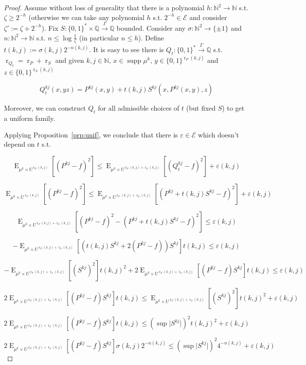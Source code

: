 \documentclass{article}
\numberwithin{equation}{section}
\theoremstyle{definition}
\theoremstyle{plain}
\newcommand{\Words}{{\{ 0, 1 \}^*}}
\newcommand{\WordsLen}[1]{{\{ 0, 1 \}^{#1}}}
\DeclareMathOperator{\Supp}{supp}
\DeclareMathOperator{\E}{E}
\DeclareMathOperator{\R}{r}
\newcommand{\Nats}{\mathbb{N}}
\newcommand{\Rats}{\mathbb{Q}}
\newcommand{\Abs}[1]{\lvert #1 \rvert}
\newcommand{\Fall}{\mathcal{E}}
\newcommand{\Scheme}{\xrightarrow{\Gamma}}
\begin{document}
\begin{proof}

Assume without loss of generality that there is a polynomial ${h: \Nats^2 \rightarrow \Nats}$ s.t. $\zeta \geq 2^{-h}$ (otherwise we can take any polynomial $h$ s.t. $2^{-h} \in \Fall$ and consider $\zeta':=\zeta+2^{-h}$). Fix $S: \Words \times \Rats \Scheme \Rats$ bounded. Consider any ${\sigma: \Nats^2 \rightarrow \{ \pm 1 \}}$ and $n: \Nats^2 \rightarrow \Nats$ s.t. $n \leq \log \frac{1}{\zeta}$ (in particular $n \leq h$). Define ${t(k,j) := \sigma(k,j) 2^{-n(k,j)}}$. It is easy to see there is ${Q_t: \Words \Scheme \Rats}$ s.t. ${\R_{Q_t}=\R_P+\R_S}$ and given $k,j \in \Nats$, $x \in \Supp \mu^k$, ${y \in \WordsLen{\R_P(k,j)}}$ and ${z \in \WordsLen{ \R_S(k,j)}}$

$$Q_t^{kj}(x,yz) = P^{kj}(x,y) + t(k,j) S^{kj}(x,P^{kj}(x,y),z)$$

Moreover, we can construct $Q_t$ for all admissible choices of $t$ (but fixed $S$) to get a uniform family.

Applying Proposition~\ref{prp:unif}, we conclude that there is $\varepsilon \in \Fall$ which doesn't depend on $t$ s.t.

$$\E_{\mu^k \times U^{\R_P(k,j)}}[(P^{kj} - f)^2] \leq \E_{\mu^k \times U^{\R_P(k,j)+\R_S(k,j)}}[(Q_t^{kj} - f)^2] + \varepsilon(k,j)$$

$$\E_{\mu^k \times U^{\R_P(k,j)}}[(P^{kj} - f)^2] \leq \E_{\mu^k \times U^{\R_P(k,j)+\R_S(k,j)}}[(P^{kj} + t(k,j)S^{kj}  - f)^2] + \varepsilon(k,j)$$

$$\E_{\mu^k \times U^{\R_P(k,j)+\R_S(k,j)}}[(P^{kj} - f)^2 - (P^{kj} + t(k,j)S^{kj} - f)^2] \leq \varepsilon(k,j)$$

$$-\E_{\mu^k \times U^{\R_P(k,j)+\R_S(k,j)}}[(t(k,j)S^{kj} + 2 (P^{kj} - f)) S^{kj}] t(k,j) \leq \varepsilon(k,j)$$

$$-\E_{\mu^k \times U^{\R_P(k,j)+\R_S(k,j)}}[(S^{kj})^2] t(k,j)^2 + 2 \E_{\mu^k \times U^{\R_P(k,j)+\R_S(k,j)}}[(P^{kj} - f) S^{kj}] t(k,j) \leq \varepsilon(k,j)$$

$$2 \E_{\mu^k \times U^{\R_P(k,j)+\R_S(k,j)}}[(P^{kj} - f) S^{kj}] t(k,j) \leq \E_{\mu^k \times U^{\R_P(k,j)+\R_S(k,j)}}[(S^{kj})^2] t(k,j)^2 + \varepsilon(k,j)$$

$$2 \E_{\mu^k \times U^{\R_P(k,j)+\R_S(k,j)}}[(P^{kj} - f) S^{kj}] t(k,j) \leq (\sup \Abs{S^{kj}})^2 t(k,j)^2 + \varepsilon(k,j)$$

$$2 \E_{\mu^k \times U^{\R_P(k,j)+\R_S(k,j)}}[(P^{kj} - f) S^{kj}] \sigma(k,j) 2^{-n(k,j)} \leq (\sup \Abs{S^{kj}})^2 4^{-n(k,j)} + \varepsilon(k,j)$$


\end{proof}
\end{document}

